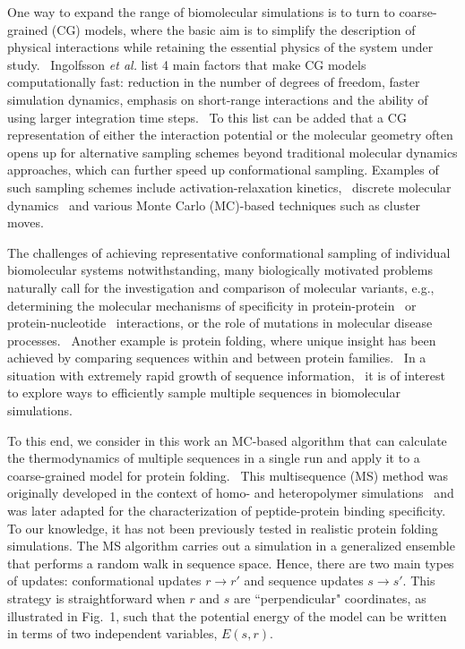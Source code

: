 \documentclass[
aip,
rsi,%
amsmath,amssymb,
reprint,%
]{revtex4-1}
\newcommand	 {\sbar}	{{s}}
\newcommand	 {\rbar}	{{r}}
\begin{document}
One way to expand the range of biomolecular simulations is to turn to coarse-grained (CG) models, where the basic aim is to simplify the description of physical interactions while retaining the essential physics of the system under study.~\cite{Riniker2012} Ingolfsson \textit{et al.} list 4 main factors that make CG models computationally fast: reduction in the number of degrees of freedom, faster simulation dynamics, emphasis on short-range interactions and the ability of using larger integration time steps.~\cite{Ingolfsson2014} To this list can be added that a CG representation of either the interaction potential or the molecular geometry often opens up for alternative sampling schemes beyond traditional molecular dynamics approaches, which can further speed up conformational sampling. Examples of such sampling schemes include activation-relaxation kinetics,~\cite{Beland2011} discrete molecular dynamics~\cite{Proctor2011} and various Monte Carlo (MC)-based techniques such as cluster moves.~\cite{Vitalis2009} 

The challenges of achieving representative conformational sampling of individual biomolecular systems notwithstanding, many biologically motivated problems naturally call for the investigation and comparison of molecular variants, e.g., determining the molecular mechanisms of specificity in protein-protein~\cite{Zarrinpar2003,Hakes2007} or protein-nucleotide~\cite{Rohs2010} interactions, or the role of mutations in molecular disease processes.~\cite{Ross2004} Another example is protein folding, where unique insight has been achieved by comparing sequences within and between protein families.~\cite{Tzul2017,Wensley2010} In a situation with extremely rapid growth of sequence information,~\cite{Vukmirovic2000} it is of interest to explore ways to efficiently sample multiple sequences in biomolecular simulations. 

To this end, we consider in this work an MC-based algorithm that can calculate the thermodynamics of multiple sequences in a single run and apply it to a coarse-grained model for protein folding.~\cite{Bhattacherjee2012} This multisequence (MS) method was originally developed in the context of homo- and heteropolymer simulations~\cite{Irback1995} and was later adapted for the characterization of peptide-protein binding specificity.~\cite{Bhattacherjee2013,Wallin2017} To our knowledge, it has not been previously tested in realistic protein folding simulations. The MS algorithm carries out a simulation in a generalized ensemble that performs a random walk in sequence space. Hence, there are two main types of updates: conformational updates $\rbar\rightarrow\rbar'$ and sequence updates $\sbar\rightarrow\sbar'$. This strategy is straightforward when $\rbar$ and $\sbar$ are ``perpendicular" coordinates, as illustrated in Fig.~1,  such that the potential energy of the model can be written in terms of two independent variables, $E(\sbar,\rbar)$. 
\end{document}

